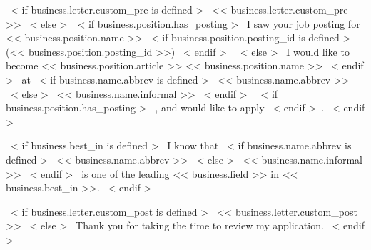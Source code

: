 ~< if business.letter.custom_pre is defined >~
  << business.letter.custom_pre >>%
~< else >~~< if business.position.has_posting >~%
I saw your job posting for << business.position.name >>
    ~< if business.position.posting_id is defined >~ (<< business.position.posting_id >>) ~< endif >~
~< else >~
    I would like to become << business.position.article >> << business.position.name >>
~< endif >~
at 
~< if business.name.abbrev is defined >~
    << business.name.abbrev >>%
~< else >~
    << business.name.informal >>%
~< endif >~
~< if business.position.has_posting >~
    , and would like to apply%
~< endif >~.
~< endif >~

~< if business.best_in is defined >~
    I know that
    ~< if business.name.abbrev is defined >~
        << business.name.abbrev >>
    ~< else >~
        << business.name.informal >>
    ~< endif >~
    is one of the leading << business.field >> in << business.best_in >>.
~< endif >~



~< if business.letter.custom_post is defined >~
  << business.letter.custom_post >>
~< else >~
Thank you for taking the time to review my application.
~< endif >~

